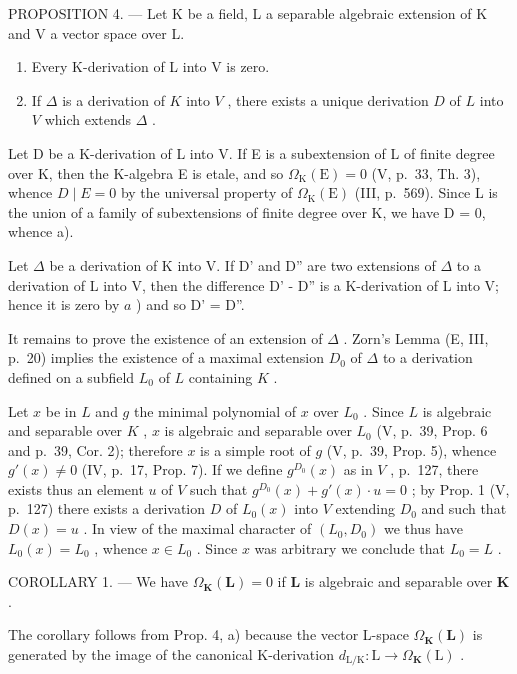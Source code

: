 PROPOSITION 4. --- Let K be a field, L a separable algebraic extension of K and V a vector space over L.

\begin{enumerate}
\def\labelenumi{\alph{enumi})}
\item
  Every K-derivation of L into V is zero.
\item
  If \(\Delta\) is a derivation of \(K\) into \(V\) , there exists a unique derivation \(D\) of \(L\) into \(V\) which extends \(\Delta\) .
\end{enumerate}

Let D be a K-derivation of L into V. If E is a subextension of L of finite degree over K, then the K-algebra E is etale, and so \(\Omega_{\mathrm{K}}(\mathrm{E}) = 0\) (V, p.~33, Th. 3), whence \(D \mid E = 0\) by the universal property of \(\Omega_{\mathrm{K}}(\mathrm{E})\) (III, p.~569). Since L is the union of a family of subextensions of finite degree over K, we have D = 0, whence a).

Let \(\Delta\) be a derivation of K into V. If D' and D'' are two extensions of \(\Delta\) to a derivation of L into V, then the difference D' - D'' is a K-derivation of L into V; hence it is zero by \(a\) ) and so D' = D''.

It remains to prove the existence of an extension of \(\Delta\) . Zorn's Lemma (E, III, p.~20) implies the existence of a maximal extension \(D_0\) of \(\Delta\) to a derivation defined on a subfield \(L_0\) of \(L\) containing \(K\) .

Let \(x\) be in \(L\) and \(g\) the minimal polynomial of \(x\) over \(L_0\) . Since \(L\) is algebraic and separable over \(K\) , \(x\) is algebraic and separable over \(L_0\) (V, p.~39, Prop. 6 and p.~39, Cor. 2); therefore \(x\) is a simple root of \(g\) (V, p.~39, Prop. 5), whence \(g'(x) \neq 0\) (IV, p.~17, Prop. 7). If we define \(g^{D_0}(x)\) as in \(V\) , p.~127, there exists thus an element \(u\) of \(V\) such that \(g^{D_0}(x) + g'(x) \cdot u = 0\) ; by Prop. 1 (V, p.~127) there exists a derivation \(D\) of \(L_0(x)\) into \(V\) extending \(D_0\) and such that \(D(x) = u\) . In view of the maximal character of \((L_0, D_0)\) we thus have \(L_0(x) = L_0\) , whence \(x \in L_0\) . Since \(x\) was arbitrary we conclude that \(L_0 = L\) .

COROLLARY 1. --- We have \(\Omega_{\mathbf{K}}(\mathbf{L}) = 0\) if \(\mathbf{L}\) is algebraic and separable over \(\mathbf{K}\) .

The corollary follows from Prop. 4, a) because the vector L-space \(\Omega_{\mathbf{K}}(\mathbf{L})\) is generated by the image of the canonical K-derivation \(d_{\mathrm{L / K}}: \mathrm{L} \to \Omega_{\mathbf{K}}(\mathrm{L})\) .

